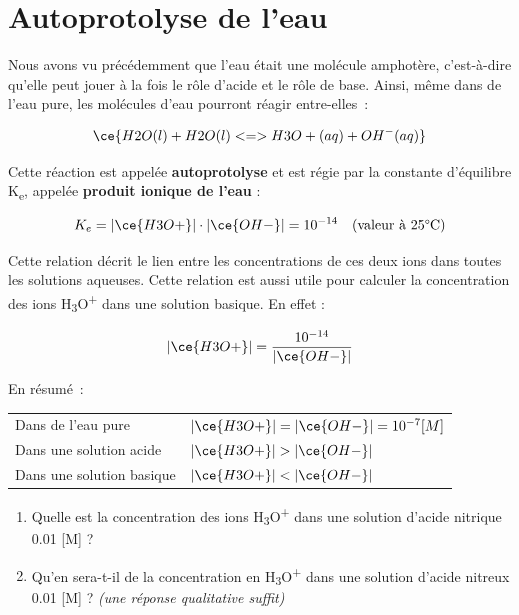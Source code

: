 \documentclass[
  11pt,
  a4paper,
  openany]{book}
\providecommand{\tightlist}{%
  \setlength{\itemsep}{0pt}\setlength{\parskip}{0pt}}
\begin{document}
\clearpage

\hypertarget{autoprotolyse-de-leau}{%
\section{Autoprotolyse de l'eau}\label{autoprotolyse-de-leau}}

Nous avons vu précédemment que l'eau était une molécule amphotère, c'est-à-dire qu'elle peut jouer à la fois le rôle d'acide et le rôle de base. Ainsi, même dans de l'eau pure, les molécules d'eau pourront réagir entre-elles~:

\[
\ce{H2O(l) + H2O(l) <=> H3O+(aq) + OH^{-}(aq)}
\]

Cette réaction est appelée \textbf{autoprotolyse} et est régie par la constante d'équilibre K\textsubscript{e}, appelée \textbf{produit ionique de l'eau} :

\[
K_e = |\ce{H3O+}| \cdot |\ce{OH-}| = 10^{-14} \quad \text{(valeur à 25°C)}
\]

Cette relation décrit le lien entre les concentrations de ces deux ions dans toutes les solutions aqueuses. Cette relation est aussi utile pour calculer la concentration des ions H\textsubscript{3}O\textsuperscript{+} dans une solution basique. En effet :

\[
|\ce{H3O+}| = \frac{10^{-14}}{|\ce{OH-}|}
\]

En résumé~:

\begin{longtable}[]{@{}
  >{\raggedright\arraybackslash}p{}
  >{\centering\arraybackslash}p{}@{}}
\toprule()
\endhead
Dans de l'eau pure & \(|\ce{H3O+}| = |\ce{OH-}| = 10^{-7} [M]\) \\
Dans une solution acide & \(|\ce{H3O+}| > |\ce{OH-}|\) \\
Dans une solution basique & \(|\ce{H3O+}| < |\ce{OH-}|\) \\
\bottomrule()
\end{longtable}

\begin{Exercise}

\begin{enumerate}
\def\labelenumi{\alph{enumi}.}
\tightlist
\item
  Quelle est la concentration des ions H\textsubscript{3}O\textsuperscript{+} dans une solution d'acide nitrique 0.01 {[}M{]} ?
\item
  Qu'en sera-t-il de la concentration en H\textsubscript{3}O\textsuperscript{+} dans une solution d'acide nitreux 0.01 {[}M{]} ?
  \emph{(une réponse qualitative suffit)}
\end{enumerate}

\end{Exercise}
\end{document}
